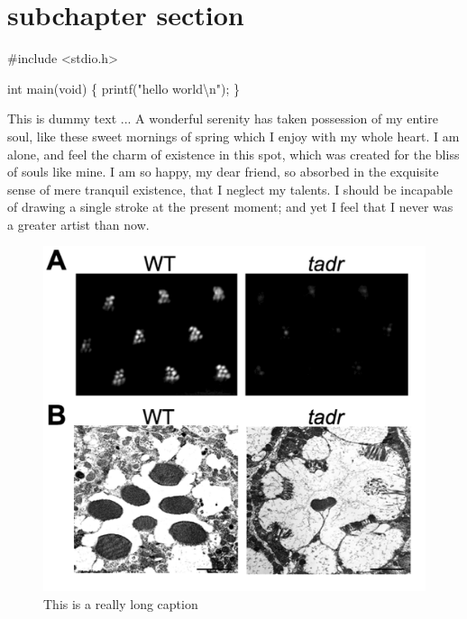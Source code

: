 \documentclass[letterpaper,oneside,12pt]{book}
\newenvironment{Shaded}{}{}
\newcommand{\DataTypeTok}[1]{\textcolor[rgb]{0.56,0.13,0.00}{{#1}}}
\newcommand{\CharTok}[1]{\textcolor[rgb]{0.25,0.44,0.63}{{#1}}}
\newcommand{\StringTok}[1]{\textcolor[rgb]{0.25,0.44,0.63}{{#1}}}
\newcommand{\OtherTok}[1]{\textcolor[rgb]{0.00,0.44,0.13}{{#1}}}
\newcommand{\NormalTok}[1]{{#1}}
\begin{document}
\section{subchapter section}\label{subchapter-section-2}

\begin{Shaded}
\begin{Highlighting}[]

\OtherTok{#include <stdio.h>}

\DataTypeTok{int} \NormalTok{main(}\DataTypeTok{void}\NormalTok{)}
\NormalTok{\{}
    \NormalTok{printf(}\StringTok{"hello world}\CharTok{\textbackslash{}n}\StringTok{"}\NormalTok{);}
\NormalTok{\}}
\end{Highlighting}
\end{Shaded}




This is dummy text ... A wonderful serenity has taken possession of my entire soul, like these sweet mornings of spring which I enjoy with my whole heart. I am alone, and feel the charm of existence in this spot, which was created for the bliss of souls like mine. I am so happy, my dear friend, so absorbed in the exquisite sense of mere tranquil existence, that I neglect my talents. I should be incapable of drawing a single stroke at the present moment; and yet I feel that I never was a greater artist than now.


\begin{figure}[h!]
\centering
\label{fig:two}
\includegraphics[width=\textwidth]{figs/fig2.jpg}
\caption[this is a short caption]{This is a really long caption}
\end{figure}
\end{document}
